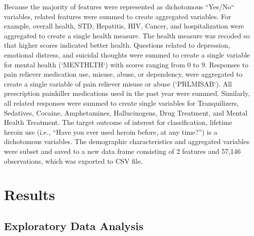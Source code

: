 \documentclass[sigconf]{acmart}
\begin{document}
Because the majority of features were represented as dichotomous ``Yes/No`` 
variables, related features were summed to create aggregated variables. For 
example, overall health, STD, Hepatitis, HIV, Cancer, and hospitalization were 
aggregated to create a single health measure. The health measure was recoded
so that higher scores indicated better health. Questions related to depression, 
emotional distress, and suicidal thoughts were summed to create a single 
variable for mental health (`MENTHLTH`) with scores ranging from 0 to 9. 
Responses to pain reliever medication use, misuse, abuse, or dependency, 
were aggregated to create a single variable of pain reliever misuse or abuse
(`PRLMISAB`). All prescription painkiller medications used in the past year
were summed. Similarly, all related responses were summed to create single 
variables for Tranquilizers, Sedatives, Cocaine, Amphetamines, Hallucinogens, 
Drug Treatment, and Mental Health Treatment. The target outcome of interest for 
classification, lifetime heroin use (i.e., ``Have you ever used heroin before, 
at any time?'') is a dichotomous variables. The demographic characteristics 
and aggregated variables were subset and saved to a new data frame consisting 
of 2 features and 57,146 observations, which was exported to CSV file. 


\section{Results}

\subsection{Exploratory Data Analysis}
\end{document}
